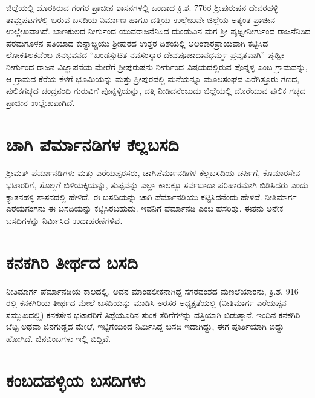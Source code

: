 ಜಿಲ್ಲೆಯಲ್ಲಿ ದೊರಕಿರುವ ಗಂಗರ ಪ್ರಾಚೀನ ಶಾಸನಗಳಲ್ಲಿ ಒಂದಾದ ಕ್ರಿ.ಶ. 776ರ ಶ‍್ರೀಪುರುಷನ ದೇವರಹಳ್ಳಿ ತಾಮ್ರಪಟಗಳಲ್ಲಿ ಬರುವ ಬಸದಿಯ ನಿರ್ಮಾಣ ಹಾಗೂ ದತ್ತಿಯ ಉಲ್ಲೇಖವೇ ಜಿಲ್ಲೆಯ ಅತ್ಯಂತ ಪ್ರಾಚೀನ ಉಲ್ಲೇಖವಾಗಿದೆ. ಬಾಣಕುಲದ ನೀರ್ಗುಂದ ಯುವರಾಜನೆನಿಸಿದ ದುಂಡುವಿನ ಮಗ ಶ‍್ರೀ ಪೃಥ್ವೀನೀರ್ಗುಂದ ರಾಜನೆನಿಸಿದ ಪರಮಗೂಳನ ಪತಿಯಾದ ಕುನ್ದಾಚ್ಚಿಯು ಶ‍್ರೀಪುರದ ಉತ್ತರ ದಿಶೆಯಲ್ಲಿ ಅಲಂಕಾರಪ್ರಾಯವಾಗಿ ಕಟ್ಟಿಸಿದ ಲೋಕತಿಲಕವೆಂಬ ಜಿನಭವನದ “ಖಂಡಸ್ಫುಟಿತ ನವಸಂಸ್ಕಾರ ದೇವಪೂಜಾದಾನಧರ್ಮ್ಮ ಪ್ರವೃತ್ತವಾಗಿ” ಪೃಥ್ವೀ ನೀರ್ಗುಂದ ರಾಜನ ವಿಜ್ಞಾಪನೆಯ ಮೇರೆಗೆ ಶ‍್ರೀಪುರುಷನು ನೀರ್ಗುಂದ ವಿಷಯದಲ್ಲಿರುವ ಪೊನ್ನಳ್ಳಿ ಎಂಬ ಗ್ರಾಮವನ್ನು, ಆ ಗ್ರಾಮದ ಕೆರೆಯ ಕೆಳಗೆ ಭೂಮಿಯನ್ನು ಮತ್ತು ಶ‍್ರೀಪುರದಲ್ಲಿ ಮನೆಯನ್ನೂ ಮೂಲಸಂಘದ ಎರೆಗಿತ್ತೂರು ಗಣದ, ಪುಲಿಕಗಚ್ಛದ ಚಂದ್ರನಂದಿ ಗುರುವಿಗೆ ಪೊನ್ನಳ್ಳಿಯನ್ನು, ದತ್ತಿ ನೀಡಿದನೆಂಬುದು ಜಿಲ್ಲೆಯಲ್ಲಿ ದೊರೆಯುವ ಪುಲಿಕ ಗಚ್ಛದ ಪ್ರಾಚೀನ ಉಲ್ಲೇಖವಾಗಿದೆ. 


\section{ಚಾಗಿ ಪೆರ್ಮಾನಡಿಗಳ ಕೆಲ್ಲಬಸದಿ}

ಶ‍್ರೀಮತ್​ ಪೆರ್ಮಾನಡಿಗಳು ಮತ್ತು ಎರೆಯಪ್ಪರಸರು, ಚಾಗಿಪೆರ್ಮಾನಡಿಗಳ ಕೆಲ್ಲಬಸದಿಯ ಚರ್ಪಿಗೆ, ಕೊಮಾರಸೇನ ಭಟಾರರಿಗೆ, ಸೊಲ್ಲಗೆ ಬಿಳಿಯಕ್ಕಿಯನ್ನು, ತುಪ್ಪವನ್ನು ಎಲ್ಲಾ ಕಾಲಕ್ಕೂ ಸರ್ವಬಾದಾ ಪರಿಹಾರಮಾಗಿ ಬಿಡಿಸಿದರು ಎಂದು ಕ್ಯಾತನಹಳ್ಳಿ ಶಾಸನದಲ್ಲಿ ಹೇಳಿದೆ. ಈ ಬಸದಿಯನ್ನು ಚಾಗಿ ಪೆರ್ಮಾನಡಿಯು ಕಟ್ಟಿಸಿದನೆಂದು ಹೇಳಿದೆ. ನೀತಿಮಾರ್ಗ ಎರೆಯಗಂಗನು ಈ ಬಸದಿಯನ್ನು ಕಟ್ಟಿಸಿರಬಹುದು. ಇವನಿಗೆ ಪೆರ್ಮಾನಡಿ ಎಂಬ ಹೆಸರಿತ್ತು. ಈತನು ಅನೇಕ ಬಸದಿಗಳನ್ನು ನಿರ್ಮಿಸಿದ ಉದಾಹರಣೆಗಳಿವೆ.


\section{ಕನಕಗಿರಿ ತೀರ್ಥದ ಬಸದಿ}

ನೀತಿಮಾರ್ಗ ಪೆರ್ಮಾನಡಿಯ ಕಾಲದಲ್ಲಿ, ಅವನ ಮಾಂಡಲೀಕನಾಗಿದ್ದ ಸಗರವಂಶದ ಮಣಲೆಯಾರನು, ಕ್ರಿ.ಶ. 916 ರಲ್ಲಿ ಕನಕಗಿರಿಯ ತೀರ್ಥದ ಮೇಲೆ ಬಸದಿಯನ್ನು ಮಾಡಿಸಿ ಅರಸರ ಅಧ್ಯಕ್ಷತೆಯಲ್ಲಿ (ನೀತಿಮಾರ್ಗ ಎರೆಯಪ್ಪನ ಸಮ್ಮುಖದಲ್ಲಿ) ಕನಕಸೇನ ಭಟಾರರಿಗೆ ತಿಪ್ಪೆಯೂರಿನ ಸುಂಕ ತೆರಿಗೆಗಳನ್ನು ದತ್ತಿಯಾಗಿ ಬಿಡುತ್ತಾನೆ. ಇಂದಿನ ಕನಕಗಿರಿ ಬೆಟ್ಟ ಅಥವಾ ಜಿನಗುಡ್ಡದ ಮೇಲೆ, ಇಟ್ಟಿಗೆಯಿಂದ ನಿರ್ಮಿಸಿದ್ದ ಬಸದಿ ಇದಾಗಿದ್ದು, ಈಗ ಪೂರ್ತಿಯಾಗಿ ಬಿದ್ದು ಹೋಗಿದೆ. ಜಿನಬಿಂಬಗಳು ಇಲ್ಲಿ ಬಿದ್ದಿವೆ.


\section{ಕಂಬದಹಳ್ಳಿಯ ಬಸದಿಗಳು}

